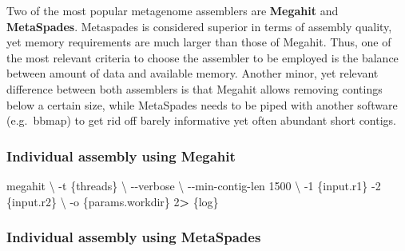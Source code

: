 \documentclass[
]{book}
\newenvironment{Shaded}{\begin{snugshade}}{\end{snugshade}}
\newcommand{\AttributeTok}[1]{\textcolor[rgb]{0.77,0.63,0.00}{#1}}
\newcommand{\DataTypeTok}[1]{\textcolor[rgb]{0.13,0.29,0.53}{#1}}
\newcommand{\DecValTok}[1]{\textcolor[rgb]{0.00,0.00,0.81}{#1}}
\newcommand{\ExtensionTok}[1]{#1}
\newcommand{\NormalTok}[1]{#1}
\newcommand{\OperatorTok}[1]{\textcolor[rgb]{0.81,0.36,0.00}{\textbf{#1}}}
\begin{document}
Two of the most popular metagenome assemblers are \textbf{Megahit} and \textbf{MetaSpades}. Metaspades is considered superior in terms of assembly quality, yet memory requirements are much larger than those of Megahit. Thus, one of the most relevant criteria to choose the assembler to be employed is the balance between amount of data and available memory. Another minor, yet relevant difference between both assemblers is that Megahit allows removing contings below a certain size, while MetaSpades needs to be piped with another software (e.g.~bbmap) to get rid off barely informative yet often abundant short contigs.

\hypertarget{individual-assembly-using-megahit}{%
\subsubsection*{Individual assembly using Megahit}\label{individual-assembly-using-megahit}}

\small

\begin{Shaded}
\begin{Highlighting}[]
\ExtensionTok{megahit} \DataTypeTok{\textbackslash{}}
    \AttributeTok{{-}t}\NormalTok{ \{threads\} }\DataTypeTok{\textbackslash{}}
    \AttributeTok{{-}{-}verbose} \DataTypeTok{\textbackslash{}}
    \AttributeTok{{-}{-}min{-}contig{-}len}\NormalTok{ 1500 }\DataTypeTok{\textbackslash{}}
    \AttributeTok{{-}1}\NormalTok{ \{input.r1\} }\AttributeTok{{-}2}\NormalTok{ \{input.r2\} }\DataTypeTok{\textbackslash{}}
    \AttributeTok{{-}o}\NormalTok{ \{params.workdir\}}
    \DecValTok{2}\OperatorTok{\textgreater{}}\NormalTok{ \{log\}}
\end{Highlighting}
\end{Shaded}

\normalsize

\hypertarget{individual-assembly-using-metaspades}{%
\subsubsection*{Individual assembly using MetaSpades}\label{individual-assembly-using-metaspades}}

\small
\end{document}
